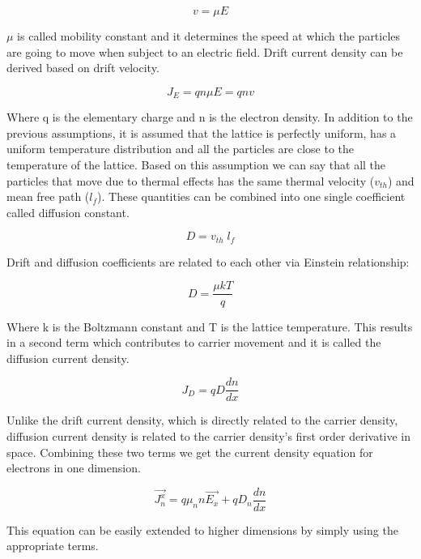 \begin{equation}
v=\mu E
\end{equation}

$\mu$ is called mobility constant and it determines the speed at which the particles are going to move when subject to an electric field. Drift current density can be derived based on drift velocity.

\begin{equation}
J_E=q n\mu E=q n v 
\end{equation}

Where q is the elementary charge and n is the electron density. In addition to the previous assumptions, it is assumed that the lattice is perfectly uniform, has a uniform temperature distribution and all the particles are close to the temperature of the lattice. Based on this assumption we can say that all the particles that move due to thermal effects has the same thermal velocity ($v_{th}$) and mean free path ($l_f$). These quantities can be combined into one single coefficient called diffusion constant. 

\begin{equation}
D=v_{th} \;l_f
\end{equation}

Drift and diffusion coefficients are related to each other via Einstein relationship:

\begin{equation}
D=\frac{\mu k T}{q}
\end{equation}

Where k is the Boltzmann constant and T is the lattice temperature. This results in a second term which contributes to carrier movement and it is called the diffusion current density.

\begin{equation}
J_D=qD\frac{dn}{dx}
\end{equation}

Unlike the drift current density, which is directly related to the carrier density, diffusion current density is related to the carrier density's first order derivative in space. Combining these two terms we get the current density equation for electrons in one dimension.

\begin{equation}
\vec{J_n^x}=q \mu_{n} n \vec{E_x}+qD_{n} \frac{dn}{dx} 
\label{cdenn}
\end{equation}

This equation can be easily extended to higher dimensions by simply using the appropriate terms.


